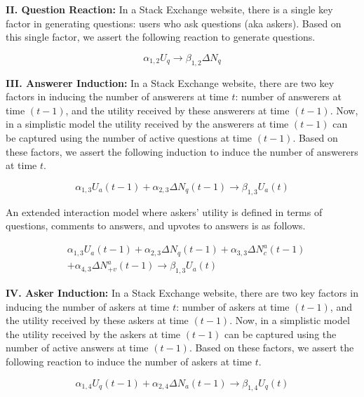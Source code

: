 \documentclass{sig-alternate-10pt}
\begin{document}
\noindent \textbf{II. Question Reaction:} In a Stack Exchange website, there is a single key factor in generating questions: users who ask questions (aka askers). Based on this single factor, we assert the following reaction to generate questions.
  
  \begin{equation*}
  \alpha_{1, 2} U_q \rightarrow \beta_{1, 2} \Delta N_q
  \end{equation*}
  
\noindent \textbf{III. Answerer Induction:} In a Stack Exchange website, there are two key factors in inducing the number of answerers at time $t$: number of answerers at time $(t-1)$, and the utility received by these answerers at time $(t-1)$. Now, in a simplistic model the utility received by the answerers at time $(t-1)$ can be captured using the number of active questions at time $(t-1)$. Based on these factors, we assert the following induction to induce the number of answerers at time $t$.
  
  \begin{equation*}
  \alpha_{1, 3} U_a(t-1) + \alpha_{2, 3} \Delta N_q(t-1) \rightarrow \beta_{1, 3} U_a(t)
  \end{equation*}
  
\noindent An extended interaction model where askers' utility is defined in terms of questions, comments to answers, and upvotes to answers is as follows.
  
  \begin{equation*}
  \begin{split}
  & \alpha_{1, 3} U_a(t-1) + \alpha_{2, 3} \Delta N_q(t-1) + \alpha_{3, 3} \Delta N_c^a(t-1)\\ 
  & + \alpha_{4, 3} \Delta N_{+v}^a(t-1) \rightarrow \beta_{1, 3} U_a(t) 
  \end{split}
  \end{equation*}
  
  
\noindent \textbf{IV. Asker Induction:} In a Stack Exchange website, there are two key factors in inducing the number of askers at time $t$: number of askers at time $(t-1)$, and the utility received by these askers at time $(t-1)$. Now, in a simplistic model the utility received by the askers at time $(t-1)$ can be captured using the number of active answers at time $(t-1)$. Based on these factors, we assert the following reaction to induce the number of askers at time $t$. 

    \begin{equation*}
    \alpha_{1, 4} U_q(t-1) + \alpha_{2, 4} \Delta N_a(t-1) \rightarrow \beta_{1, 4} U_q(t)
    \end{equation*}
  
\end{document}

